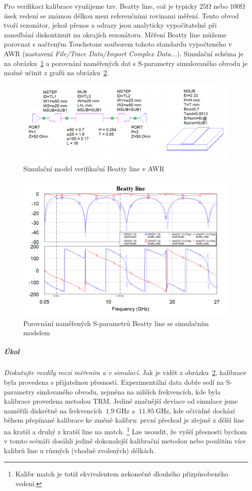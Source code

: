 \documentclass[11pt,a4paper]{article}
\newcommand{\Ohm}{\mathrm{\Omega}}
\newcommand{\GHz}{\mathrm{GHz}}
\begin{document}
Pro verifikaci kalibrace využijeme tzv. Beatty line, což je typicky $25\Ohm$ nebo $100\Ohm$ úsek vedení se známou délkou mezi referenčními rovinami měření. Tento obvod tvoří rezonátor, jehož přenos a odrazy jsou analyticky vypočitatelné při zanedbání diskontinuit na okrajích rezonátoru. Měření Beatty line můžeme porovnat s načteným Touchstone souborem tohoto standardu vypočteného v AWR (nastavení \emph{File/Trace Data/Import Complex Data...}). Simulační schéma je na obrázku~\ref{fig:beatty-line-awr} a porovnání naměřených dat s S-parametry simulovaného obvodu je možné učinit z grafů na obrázku~\ref{fig:beatty-line}.
\begin{figure}[!ht]
    \centering
    \includegraphics[width=.8\textwidth]{src/beatty-line-awr.png}
    \caption{\label{fig:beatty-line-awr}Simulační model verifikační Beatty line v AWR}
\end{figure}
\begin{figure}[!ht]
    \centering
    \includegraphics[width=.9\textwidth]{src/beatty-line.png}
    \caption{\label{fig:beatty-line}Porovnání naměřených S-parametrů Beatty line se simulačním modelem}
\end{figure}
\subparagraph*{Úkol} \emph{Diskutujte rozdíly mezi měřením a v simulací.} Jak je vidět z obrázku~\ref{fig:beatty-line}, kalibrace byla provedena s přijatelnou přesností. Experimentální data dobře sedí na S-parametry simlovaného obvodu, zejména na nižších frekvencích, kde byla kalibrace provedena metodou TRM. Jediné značnější deviace od simulace jsme naměřili diskrétně na frekvencích $~1.9\ \GHz$ a $~11.85\ \GHz$, kde očividně dochází během přepínané kalibrace ke změně kalibru: první přechod je zřejmě z dělší line na kratší a druhý z kratší line na match.%
    \footnote{Kalibr match je totiž ekvivalentem nekonečně dlouhého přizpůsobeného vedení.}
Lze usoudit, že vyšší přesnosti bychom v tomto scénáři dosáhli jedině dokonalejší kalibrační metodou nebo použitím více kalibrů line u různých (vhodně zvolených) délkách.
\end{document}
